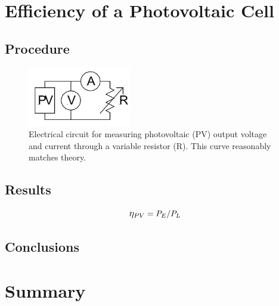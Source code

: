\documentclass[aps,prl,reprint]{revtex4-2}
\begin{document}
\section{Efficiency of a Photovoltaic Cell}

\subsection{Procedure}

\begin{figure}[h]
\includegraphics[width=0.4\textwidth]{../Images/l1_PartA.jpg}
\caption{\label{figA}Electrical circuit for measuring photovoltaic (PV) output voltage and current through a variable resistor (R). This curve reasonably matches theory.}
\end{figure}

\subsection{Results}

\newpage
\begin{equation}
    \mathlarger{\eta_{PV}}=P_E/P_L
    \label{eta_PV}
\end{equation}

\subsection{Conclusions}

\section{Summary}
\end{document}
